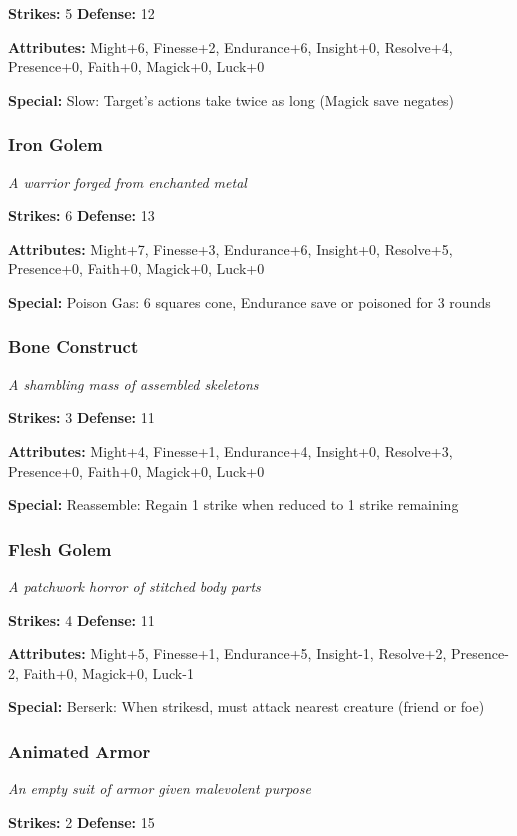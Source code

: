 \documentclass[10pt,twoside]{article}
\begin{document}
\textbf{Strikes:} 5 \quad \textbf{Defense:} 12

\textbf{Attributes:} Might+6, Finesse+2, Endurance+6, Insight+0, Resolve+4, Presence+0, Faith+0, Magick+0, Luck+0

\textbf{Special:} Slow: Target's actions take twice as long (Magick save negates)

\subsubsection{Iron Golem}
\textit{A warrior forged from enchanted metal}

\textbf{Strikes:} 6 \quad \textbf{Defense:} 13

\textbf{Attributes:} Might+7, Finesse+3, Endurance+6, Insight+0, Resolve+5, Presence+0, Faith+0, Magick+0, Luck+0

\textbf{Special:} Poison Gas: 6 squares cone, Endurance save or poisoned for 3 rounds

\subsubsection{Bone Construct}
\textit{A shambling mass of assembled skeletons}

\textbf{Strikes:} 3 \quad \textbf{Defense:} 11

\textbf{Attributes:} Might+4, Finesse+1, Endurance+4, Insight+0, Resolve+3, Presence+0, Faith+0, Magick+0, Luck+0

\textbf{Special:} Reassemble: Regain 1 strike when reduced to 1 strike remaining

\subsubsection{Flesh Golem}
\textit{A patchwork horror of stitched body parts}

\textbf{Strikes:} 4 \quad \textbf{Defense:} 11

\textbf{Attributes:} Might+5, Finesse+1, Endurance+5, Insight-1, Resolve+2, Presence-2, Faith+0, Magick+0, Luck-1

\textbf{Special:} Berserk: When strikesd, must attack nearest creature (friend or foe)

\subsubsection{Animated Armor}
\textit{An empty suit of armor given malevolent purpose}

\textbf{Strikes:} 2 \quad \textbf{Defense:} 15
\end{document}
